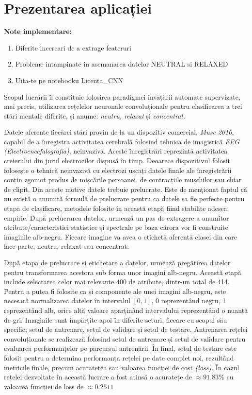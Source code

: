 \chapter{Prezentarea aplicației}\label{ch:3implementare}

\textbf{Note implementare:}
\begin{enumerate}
\item Diferite incercari de a extrage feateruri
\item Probleme intampinate in asemanarea datelor NEUTRAL si RELAXED
\item Uita-te pe notebooku Licenta\_CNN
\end{enumerate}

Scopul lucrării îl constituie folosirea paradigmei învățării automate supervizate, mai precis, utilizarea rețelelor neuronale convoluționale pentru clasificarea a trei stări mentale diferite, și anume: \textit{neutru, relaxat} și \textit{concentrat}. 

Datele aferente fiecărei stări provin de la un dispozitiv comercial, \textit{Muse 2016}, capabil de a înregistra activitatea cerebrală folosind tehnica de imagistică \textit{EEG (Electroencefalografia)}, neinvazivă. Aceste înregistrări reprezintă activitatea creierului din jurul electrozilor dispusă în timp. Deoarece dispozitivul folosit folosește o tehnică neinvazivă cu electrozi uscați datele finale ale înregistrării conțin zgomot produs de mișcările persoanei, de contracțiile mușchilor sau chiar de clipit. Din aceste motive datele trebuie prelucrate. Este de menționat faptul că nu există o anumită formulă de prelucrare pentru ca datele sa fie perfecte pentru etapa de clasificare, metodele folosite în această etapă fiind stabilite adesea empiric. După prelucrarea datelor, urmează un pas de extragere a anumitor atribute/caracteristici statistice și spectrale pe baza cărora vor fi construite imaginile alb-negru. Fiecare imagine va avea o etichetă aferentă clasei din care face parte, neutru, relaxat sau concentrat.

După etapa de prelucrare și etichetare a datelor, urmează pregătirea datelor pentru transformarea acestora sub forma unor imagini alb-negru. Această etapă include selectarea celor mai relevante 400 de atribute, dintr-un total de 414. Pentru a putea fi folosite ca și componente ale unei imagini alb-negru, este necesară normalizarea datelor în intervalul $[0,1]$, 0 reprezentând negru, 1 reprezentând alb, orice altă valoare aparținând intervalului reprezentând o nuanță de gri. Imaginile sunt împărțite apoi în diferite seturi, fiecare cu scopul său specific; setul de antrenare, setul de validare și setul de testare. Antrenarea rețelei convoluționale se realizează folosind setul de antrenare și setul de validare pentru evaluarea performanțelor pe parcursul antrenării. În final, setul de testare este folosit pentru a determina performanța rețelei pe date complet noi, rezultând metricile finale, precum acuratețea sau valoarea funcției de cost \textit{(loss)}. În cazul rețelei dezvoltate în această lucrare a fost atinsă o acuratețe de $\approx91.83\%$ cu valoarea funcției de loss de $\approx0.2511$

